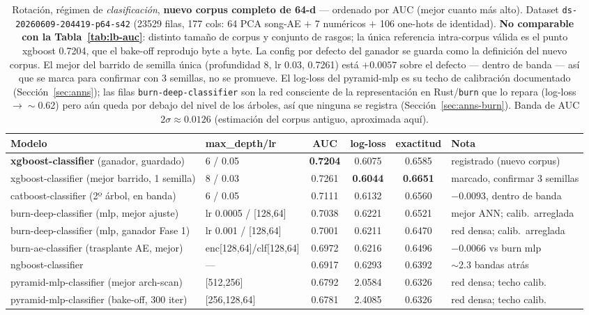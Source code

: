 \documentclass[11pt]{article}
\newcommand{\dsid}[1]{\texttt{\small #1}}
\newcommand{\best}[1]{\textbf{#1}}
\begin{document}
\begin{table}[ht]
  \centering
  \caption{Rotación, régimen de \emph{clasificación}, \textbf{nuevo corpus
  completo de 64-d} --- ordenado por AUC (mejor cuanto más alto). Dataset
  \dsid{ds-20260609-204419-p64-s42} (\num{23529} filas, 177 cols: 64 PCA song-AE
  $+$ 7 numéricos $+$ 106 one-hots de identidad). \textbf{No comparable con la
  Tabla~\ref{tab:lb-auc}}: distinto tamaño de corpus y conjunto de rasgos; la
  única referencia intra-corpus válida es el punto xgboost \num{0.7204}, que el
  bake-off reprodujo byte a byte. La config por defecto del ganador se guarda como
  la definición del nuevo corpus. El mejor del barrido de semilla única
  (profundidad 8, lr 0.03, \num{0.7261}) está $+0.0057$ sobre el defecto ---
  dentro de banda --- así que se marca para confirmar con 3 semillas, no se
  promueve. El log-loss del pyramid-mlp es su techo de calibración documentado
  (Sección~\ref{sec:anns}); las filas \texttt{burn-deep-classifier} son la red
  consciente de la representación en Rust/\texttt{burn} que lo repara (log-loss
  $\to\sim$0.62) pero aún queda por debajo del nivel de los árboles, así que
  ninguna se registra (Sección~\ref{sec:anns-burn}). Banda de AUC
  $2\sigma\approx 0.0126$ (estimación del corpus antiguo, aproximada aquí).}
  \label{tab:lb-auc-p64}
  \begin{tabular}{llcccl}
    \toprule
    Modelo & max\_depth/lr & AUC & log-loss & exactitud & Nota \\
    \midrule
    \best{xgboost-classifier} (ganador, guardado)  & 6 / 0.05  & \best{0.7204} & 0.6075 & 0.6585 & registrado (nuevo corpus) \\
    xgboost-classifier (mejor barrido, 1 semilla)  & 8 / 0.03  & 0.7261 & \best{0.6044} & \best{0.6651} & marcado, confirmar 3 semillas \\
    catboost-classifier (2º árbol, en banda)       & 6 / 0.05  & 0.7111 & 0.6132 & 0.6560 & $-0.0093$, dentro de banda \\
    burn-deep-classifier (mlp, mejor ajuste)       & lr 0.0005 / [128,64] & 0.7038 & 0.6221 & 0.6521 & mejor ANN; calib.\ arreglada \\
    burn-deep-classifier (mlp, ganador Fase 1)     & lr 0.001 / [128,64]  & 0.7001 & 0.6211 & 0.6470 & red densa; calib.\ arreglada \\
    burn-ae-classifier (trasplante AE, mejor)      & enc[128,64]/clf[128,64] & 0.6972 & 0.6216 & 0.6496 & $-0.0066$ vs burn mlp \\
    ngboost-classifier                             & ---       & 0.6917 & 0.6293 & 0.6392 & $\sim$2.3 bandas atrás \\
    pyramid-mlp-classifier (mejor arch-scan)       & [512,256] & 0.6792 & 2.0584 & 0.6326 & red densa; techo calib. \\
    pyramid-mlp-classifier (bake-off, 300 iter)    & [256,128,64] & 0.6781 & 2.4085 & 0.6326 & red densa; techo calib. \\
    \bottomrule
  \end{tabular}
\end{table}
\end{document}
